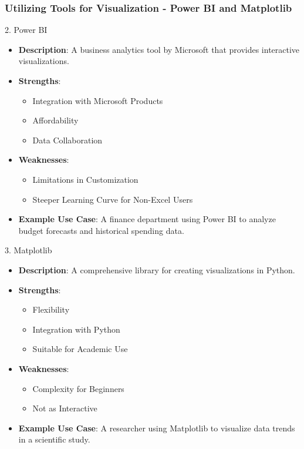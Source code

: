\documentclass[aspectratio=169]{beamer}
\begin{document}
\begin{frame}[fragile]
    \frametitle{Utilizing Tools for Visualization - Power BI and Matplotlib}
    \begin{block}{2. Power BI}
        \begin{itemize}
            \item \textbf{Description}: A business analytics tool by Microsoft that provides interactive visualizations.
            \item \textbf{Strengths}:
            \begin{itemize}
                \item Integration with Microsoft Products
                \item Affordability
                \item Data Collaboration
            \end{itemize}
            \item \textbf{Weaknesses}:
            \begin{itemize}
                \item Limitations in Customization
                \item Steeper Learning Curve for Non-Excel Users
            \end{itemize}
            \item \textbf{Example Use Case}: A finance department using Power BI to analyze budget forecasts and historical spending data.
        \end{itemize}
    \end{block}
    
    \begin{block}{3. Matplotlib}
        \begin{itemize}
            \item \textbf{Description}: A comprehensive library for creating visualizations in Python.
            \item \textbf{Strengths}:
            \begin{itemize}
                \item Flexibility
                \item Integration with Python
                \item Suitable for Academic Use
            \end{itemize}
            \item \textbf{Weaknesses}:
            \begin{itemize}
                \item Complexity for Beginners
                \item Not as Interactive
            \end{itemize}
            \item \textbf{Example Use Case}: A researcher using Matplotlib to visualize data trends in a scientific study.
        \end{itemize}
    \end{block}
\end{frame}
\end{document}
